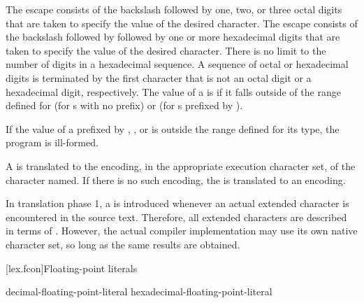 \documentclass{wg21}
\begin{document}
\begin{removedblock}
\pnum
The escape
%
 consists of the backslash followed by one,
two, or three octal digits that are taken to specify the value of the
desired character. The escape
%
consists of the backslash followed by  followed by one or more
hexadecimal digits that are taken to specify the value of the desired
character. There is no limit to the number of digits in a hexadecimal
sequence. A sequence of octal or hexadecimal digits is terminated by the
first character that is not an octal digit or a hexadecimal digit,
respectively.
%
The value of a  is  if it falls outside of the 
range defined for  (for s with no prefix) or
 (for s prefixed by ).
\begin{note}
    If the value of a  prefixed by
    , , or 
    is outside the range defined for its type,
    the program is ill-formed.
\end{note}

\pnum
A  is translated to the encoding, in the appropriate
execution character set, of the character named. If there is no such
encoding, the  is translated to an
 encoding.
\begin{note}
    In translation phase 1, a  is introduced whenever an
    actual extended
    character is encountered in the source text. Therefore, all extended
    characters are described in terms of . However,
    the actual compiler implementation may use its own native character set,
    so long as the same results are obtained.
\end{note}
\end{removedblock}

[lex.fcon]{Floating-point literals}

%
\begin{bnf}
    \br
    decimal-floating-point-literal\br
    hexadecimal-floating-point-literal
\end{bnf}
\end{document}
